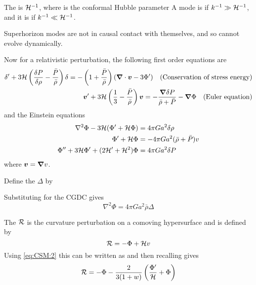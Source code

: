 \documentclass{article}
\begin{document}
\begin{definition}
The  is $\mathcal{H}^{-1}$, where
is the conformal Hubble parameter
A mode is  if $k^{-1}\gg \mathcal{H}^{-1}$, and it is  if $k^{-1}\ll \mathcal{H}^{-1}$.
\end{definition}

\begin{fact}
Superhorizon modes are not in causal contact with themselves, and so cannot evolve dynamically. 
\end{fact}

Now for a relativistic perturbation, the following first order equations are 
\begin{align}\label{eq:CSM:9}
\delta^\prime + 3\mathcal{H} \left( \frac{\delta P}{\delta \rho} - \frac{\bar{P}}{\bar{\rho}} \right) \delta = - \left( 1 + \frac{\bar{P}}{\bar{\rho}}\right) (\bm{\nabla} \cdot \bm{v} - 3\Phi^\prime) \quad \text{(Conservation of stress energy)} \\
\bm{v}^\prime + 3\mathcal{H} \left(\frac{1}{3} - \frac{\bar{P}}{\bar{\rho}} \right) \bm{v} = -\frac{\bm{\nabla} \delta P}{\bar{\rho}+\bar{P}} - \bm{\nabla}\Phi \quad \text{(Euler equation)} \\
\end{align}
and the Einstein equations 
\begin{align} \label{eq:CSM:2}
\nabla^2 \Phi - 3\mathcal{H}(\Phi^\prime + \mathcal{H}\Phi)  &= 4\pi G a^2 \delta \rho \\
\Phi^\prime + \mathcal{H}\Phi &= -4\pi G a^2 (\bar{\rho} + \bar{P}) v \\
\Phi^{\prime\prime} + 3 \mathcal{H} \Phi^\prime + (2\mathcal{H}^\prime + \mathcal{H}^2 ) \Phi &= 4\pi G a^2 \delta P 
\end{align}
where $\bm{v} = \bm{\nabla} v$.
\begin{definition}
Define the  $\Delta$ by
\end{definition}

Substituting for the CGDC gives 
\begin{equation}\label{eq:CSM:8}
\nabla^2 \Phi = 4\pi G a^2 \bar{\rho} \Delta
\end{equation}

\begin{definition}
The  $\mathcal{R}$ is the curvature perturbation on a comoving hypersurface and is defined by 
\[
\mathcal{R} = -\Phi + \mathcal{H}v
\]
Using \ref{eq:CSM:2} this can be written as 
and then recalling 
gives 
\begin{equation}\label{eq:CSM:6}
\mathcal{R} = -\Phi - \frac{2}{3(1+w)} \left( \frac{\Phi^\prime}{\mathcal{H}} + \Phi \right)
\end{equation}
\end{definition}
\end{document}
